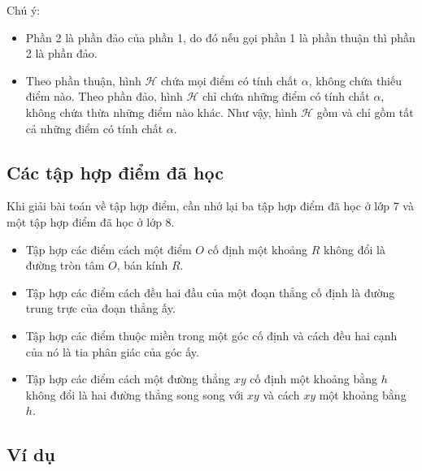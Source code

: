 	\begin{note}
		Chú ý:
		\begin{itemize}
			\item Phần 2 là phần đảo của phần 1, do đó nếu gọi phần 1 là phần thuận thì phần 2 là phần đảo.
			\item Theo phần thuận, hình $\mathscr{H}$ chứa mọi điểm có tính chất $\alpha$, không chứa thiếu điểm nào. Theo phần đảo, hình $\mathscr{H}$ chỉ chứa những điểm có tính chất $\alpha$, không chứa thừa những điểm nào khác. Như vậy, hình $\mathscr{H}$ gồm và chỉ gồm tất cả những điểm có tính chất $\alpha$.
		\end{itemize}
	\end{note}
\subsection{Các tập hợp điểm đã học}
	Khi giải bài toán về tập hợp điểm, cần nhớ lại ba tập hợp điểm đã học ở lớp 7 và một tập hợp điểm đã học ở lớp 8.
	\begin{itemize}
		\item Tập hợp các điểm cách một điểm $O$ cố định một khoảng $R$ không đổi là đường tròn tâm $O$, bán kính $R$.
		\item Tập hợp các điểm cách đều hai đầu của một đoạn thẳng cố định là đường trung trực của đoạn thẳng ấy.
		\item Tập hợp các điểm thuộc miền trong một góc cố định và cách đều hai cạnh của nó là tia phân giác của góc ấy.
		\item Tập hợp các điểm cách một đường thẳng $xy$ cố định một khoảng bằng $h$ không đổi là hai đường thẳng song song với $xy$ và cách $xy$ một khoảng bằng $h$.
	\end{itemize}
	
\subsection{Ví dụ}


